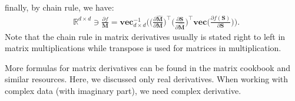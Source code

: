 \documentclass[lang=cn,10pt]{gorgeousnbook}
\numberwithin{equation}{section}%
\numberwithin{figure}{section}%
\begin{document}
\begin{remark}
finally, by chain rule, we have:
\begin{align*}
& \mathbb{R}^{d \times d} \ni \frac{\partial f}{\boldsymbol{M}} = \textbf{vec}^{-1}_{d \times d}\Big( \big(\frac{\partial \widehat{\boldsymbol{M}}}{\partial \boldsymbol{M}}\big)^\top \big(\frac{\partial \boldsymbol{S}}{\partial \widehat{\boldsymbol{M}}}\big)^\top  \textbf{vec}\big(\frac{\partial f(\boldsymbol{S})}{\partial \boldsymbol{S}}\big)\Big).
\end{align*}
Note that the chain rule in matrix derivatives usually is stated right to left in matrix multiplications while transpose is used for matrices in multiplication.
\end{remark}

More formulas for matrix derivatives can be found in the matrix cookbook \cite{petersen2012matrix} and similar resources.
Here, we discussed only real derivatives. When working with complex data (with imaginary part), we need complex derivative.
\end{document}
